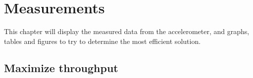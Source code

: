 \chapter{Measurements}
\label{chp:measurements2}

This chapter will display the measured data from the accelerometer, and graphs, tables and figures to try to determine the most efficient solution. 

\section{Maximize throughput}